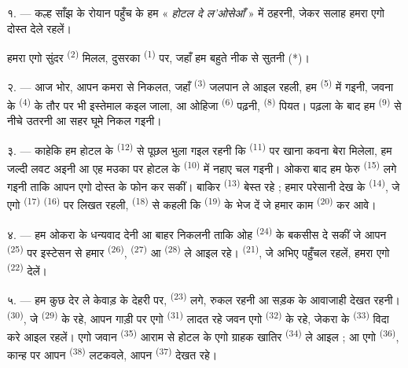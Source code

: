 
\VUsaut{3.0mm}
\VUsaut{1.6mm}
\VUsaut{2.0mm}
\VUsaut{3.4mm}

१. --- कल्ह साँझ के रोयान पहुँच के हम « \textit{होटल दे ल'ओसेआँ} » में
ठहरनी, जेकर सलाह हमरा एगो दोस्त देले रहलें।

हमरा एगो सुंदर  \textsuperscript{(2)} मिलल, दुसरका
 \textsuperscript{(1)} पर, जहाँ हम बहुते नीक से सुतनी (*)।

२. --- आज भोर, आपन कमरा से निकलत, जहाँ 
\textsuperscript{(3)} जलपान ले आइल रहली, हम 
\textsuperscript{(5)} में गइनी, जवना के 
\textsuperscript{(4)} के तौर पर भी इस्तेमाल कइल जाला, आ ओहिजा
 \textsuperscript{(6)} पढ़नी, 
\textsuperscript{(8)} पियत। पढ़ला के बाद हम 
\textsuperscript{(9)} से नीचे उतरनी आ सहर घूमे निकल गइनी।

३. --- काहेकि हम होटल के  \textsuperscript{(12)} से पूछल
भुला गइल रहनी कि  \textsuperscript{(11)} पर खाना कवना बेरा
मिलेला, हम जल्दी लवट अइनी आ एह मउका पर होटल के 
\textsuperscript{(10)} में नहाए चल गइनी। ओकरा बाद हम फेरु 
\textsuperscript{(15)} लगे गइनी ताकि आपन एगो दोस्त के फोन कर सकीं। बाकिर
 \textsuperscript{(13)} बेस्त रहे ; हमार परेसानी देख के
 \textsuperscript{(14)}, जे एगो 
\textsuperscript{(17)}  \textsuperscript{(16)}
पर लिखत रहली,
 \textsuperscript{(18)} से कहली कि 
\textsuperscript{(19)} के भेज दें जे हमार काम 
\textsuperscript{(20)} कर आवे।

४. --- हम ओकरा के धन्यवाद देनी आ बाहर निकलनी ताकि ओह 
\textsuperscript{(24)} के बकसीस दे सकीं जे आपन 
\textsuperscript{(25)} पर इस्टेसन से हमार 
\textsuperscript{(26)},  \textsuperscript{(27)} आ
 \textsuperscript{(28)} ले आइल रहे।
 \textsuperscript{(21)}, जे अभिए पहुँचल रहलें, हमरा एगो
 \textsuperscript{(22)} देलें।

५. --- हम कुछ देर ले केवाड़ के देहरी पर, 
\textsuperscript{(23)} लगे, रुकल रहनी आ सड़क के आवाजाही देखत रहनी।
 \textsuperscript{(30)}, जे 
\textsuperscript{(29)} के रहे, आपन गाड़ी पर एगो 
\textsuperscript{(31)} लादत रहे जवन एगो 
\textsuperscript{(32)} के रहे, जेकरा के  \textsuperscript{(33)} विदा करे आइल रहलें। एगो जवान  \textsuperscript{(35)} आराम से होटल के एगो ग्राहक खातिर
 \textsuperscript{(34)} ले आइल ; आ एगो 
\textsuperscript{(36)}, कान्ह पर आपन  \textsuperscript{(38)}
लटकवले, आपन  \textsuperscript{(37)} देखत रहे।

